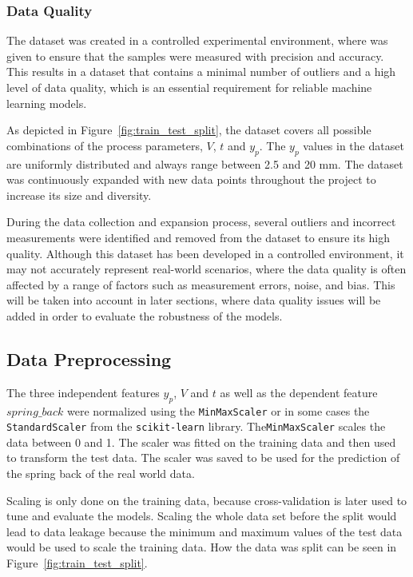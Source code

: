 \subsubsection{Data Quality}
The dataset was created in a controlled experimental environment, where
was given to ensure that the samples were measured with precision and accuracy.
This results in a dataset that contains a minimal number of outliers and a
high level of data quality, which is an essential requirement for reliable machine
learning models.

As depicted in Figure~\ref{fig:train_test_split}, the dataset covers all possible
combinations of the process parameters, $V$, $t$ and $y_p$.
The $y_p$ values in the dataset are uniformly distributed and always range between 2.5
and 20 mm.
The dataset was continuously expanded with new data points throughout the project to
increase its size and diversity.

During the data collection and expansion process, several outliers and incorrect
measurements were identified and removed from the dataset to ensure its high quality.
Although this dataset has been developed in a controlled environment, it may not
accurately represent real-world scenarios, where the data quality is often affected by
a range of factors such as measurement errors, noise, and bias.
This will be taken into account in later sections, where data quality issues will be
added in order to evaluate the robustness of the models.

\subsection{Data Preprocessing}\label{subsec:data-preprocessing}
The three independent features $y_p$, $V$ and $t$ as well as the dependent
feature $spring\_back$ were normalized using the \texttt{MinMaxScaler} or in some cases
the \texttt{StandardScaler} from the \texttt{scikit-learn}\cite{scikit-learn} library.
The\texttt{MinMaxScaler} scales the data between 0 and 1.
The scaler was fitted on the training data and then used to transform the test data.
The scaler was saved to be used for the prediction of the spring back of the real world
data.

Scaling is only done on the training data, because cross-validation is later used to
tune and evaluate the models.
Scaling the whole data set before the split would lead to data leakage because the
minimum and maximum values of the test data would be used to scale the training data.
How the data was split can be seen in Figure~\ref{fig:train_test_split}.

